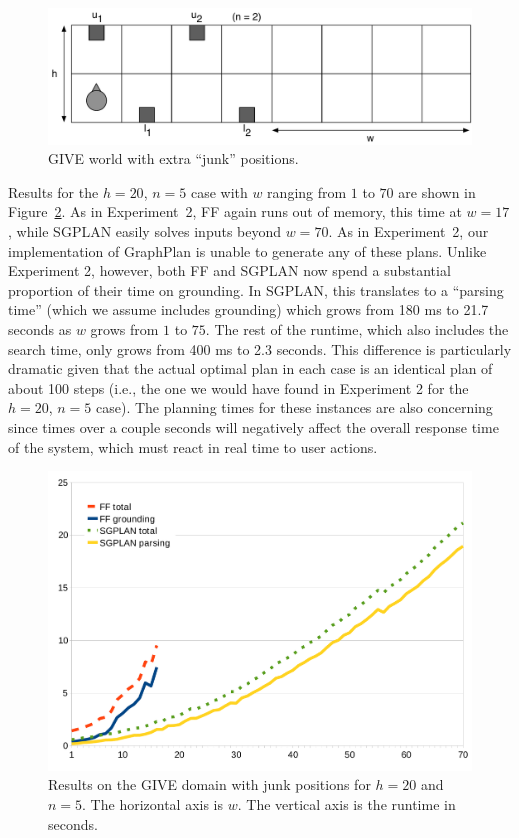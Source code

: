 \begin{figure}[t]
  \centering
  \includegraphics[width=0.80\columnwidth]{pic-empty-buttons}
  \caption{GIVE world with extra ``junk'' positions.}
  \label{fig:give-junk}
\end{figure}

Results for the $h=20$, $n=5$ case with $w$ ranging from $1$ to $70$ are
shown in Figure~\ref{fig:give-runtime-junk}. As in Experiment~2, FF again
runs out of memory, this time at $w=17$, while SGPLAN easily solves inputs
beyond $w=70$. As in Experiment~2, our implementation of GraphPlan is
unable to generate any of these plans. Unlike Experiment 2, however, both
FF and SGPLAN now spend a substantial proportion of their time on
grounding. In SGPLAN, this translates to a ``parsing time'' (which we
assume includes grounding) which grows from 180 ms to 21.7 seconds as $w$
grows from $1$ to $75$. The rest of the runtime, which also includes the
search time, only grows from 400 ms to 2.3 seconds. This difference is
particularly dramatic given that the actual optimal plan in each case is an
identical plan of about 100 steps (i.e., the one we would have found in
Experiment 2 for the $h=20$, $n=5$ case). The planning times for these
instances are also concerning since times over a couple seconds will
negatively affect the overall response time of the system, which must react
in real time to user actions.

\begin{figure}[t]
  \centering
  \includegraphics[width=0.75\columnwidth]{graph-exp3}
  \caption{Results on the GIVE domain with junk
    positions for $h=20$ and $n=5$. The horizontal axis is $w$.
    The vertical axis is the runtime in seconds.}
  \label{fig:give-runtime-junk}
\end{figure}


